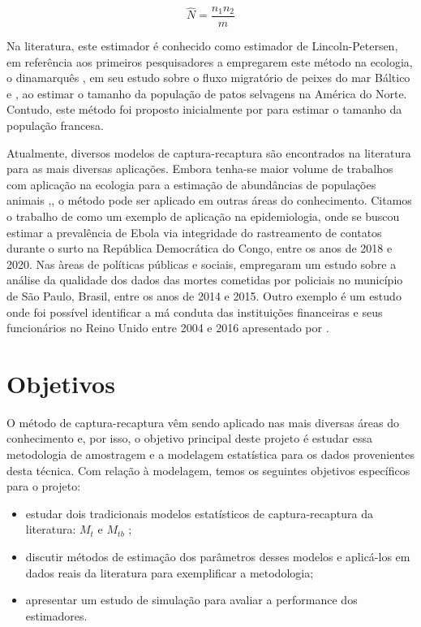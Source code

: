 \documentclass[
]{book}
\begin{document}
\[\hat{N} = \dfrac{n_1 n_2}{m}\]

Na literatura, este estimador é conhecido como estimador de Lincoln-Petersen, em referência aos primeiros pesquisadores a empregarem este método na ecologia, o dinamarquês \citet{PETERSEN1896}, em seu estudo sobre o fluxo migratório de peixes do mar Báltico e \citet{lincoln1930}, ao estimar o tamanho da população de patos selvagens na América do Norte. Contudo, este método foi proposto inicialmente por \citet{LAPLACE1783} para estimar o tamanho da população francesa.

Atualmente, diversos modelos de captura-recaptura são encontrados na literatura para as mais diversas aplicações. Embora tenha-se maior volume de trabalhos com aplicação na ecologia para a estimação de abundâncias de populações animais \citet{mccrea2014},\citet{royle2013}, o método pode ser aplicado em outras áreas do conhecimento. Citamos o trabalho de \citet{polonsky2021} como um exemplo de aplicação na epidemiologia, onde se buscou estimar a prevalência de Ebola via integridade do rastreamento de contatos durante o surto na República Democrática do Congo, entre os anos de 2018 e 2020. Nas àreas de políticas públicas e sociais, \citet{ryngelblum2021} empregaram um estudo sobre a análise da qualidade dos dados das mortes cometidas por policiais no município de São Paulo, Brasil, entre os anos de 2014 e 2015. Outro exemplo é um estudo onde foi possível identificar a má conduta das instituições financeiras e seus funcionários no Reino Unido entre 2004 e 2016 apresentado por \citet{ashton2021}.

\hypertarget{objetivos}{%
\section{Objetivos}\label{objetivos}}

O método de captura-recaptura vêm sendo aplicado nas mais diversas áreas do conhecimento e, por isso, o objetivo principal deste projeto é estudar essa metodologia de amostragem e a modelagem estatística para os dados provenientes desta técnica.
Com relação à modelagem, temos os seguintes objetivos específicos para o projeto:

\begin{itemize}
\item
  estudar dois tradicionais modelos estatísticos de captura-recaptura da literatura: \(M_t\) e \(M_{tb}\) \citet{otis1978};
\item
  discutir métodos de estimação dos parâmetros desses modelos e aplicá-los em dados reais da literatura para exemplificar a metodologia;
\item
  apresentar um estudo de simulação para avaliar a performance dos estimadores.
\end{itemize}
\end{document}
